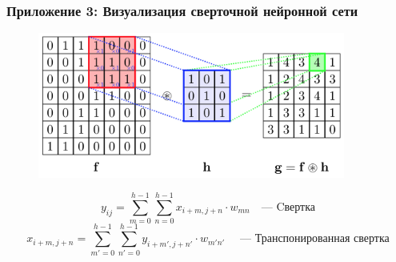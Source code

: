 \documentclass{beamer}
\begin{document}
\begin{frame}
	\label{pril3}
	\frametitle{Приложение 3: Визуализация сверточной нейронной сети}
	\begin{figure}[!hp]
		\centering
		\includegraphics[width=0.9\textwidth]{conv}
	\end{figure}
	\[ y_{ij} = \sum_{m=0}^{h-1} \sum_{n=0}^{h-1} x_{i+m, j+n} \cdot w_{mn} \quad \text{--- Cвертка} \]
	\[ x_{i+m, j+n} = \sum_{m'=0}^{h-1} \sum_{n'=0}^{h-1} y_{i+m', j+n'} \cdot w_{m'n'} \quad \text{ --- Транспонированная свертка} \]
\end{frame}
\end{document}
